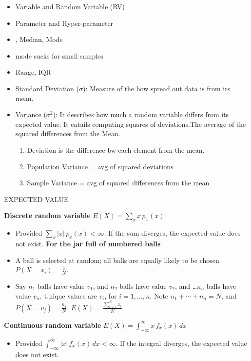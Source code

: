 \documentclass{beamer}
\begin{document}
\begin{frame}%
	\begin{itemize}
		\item Variable and Random Variable (RV)
		\item Parameter and Hyper-parameter
		\item \hyperlink{meanlabel}{}, Median, Mode
		\item mode sucks for small samples
		\item Range, IQR
		\item Standard Deviation ($\sigma$): Measure of the how spread out data is from its mean.
		\item Variance ($\sigma^2$): It describes how much a random variable differs from its expected value. It entails computing squares of deviations.The average of the squared differences from the Mean.\\
		\begin{enumerate}
			\item Deviation is the difference bw each element from the mean.\\
			\item Population Variance = avg of squared deviations\\
			\item Sample Variance = avg of squared differences from the mean
		\end{enumerate}
	\end{itemize}
\end{frame}

\begin{frame}
\hypertarget{meanlabel}{EXPECTED VALUE}\newline
\textbf{Discrete random variable}	$E(X) = \sum_x x \, p_x(x)$
	\begin{itemize}
		\item Provided $\sum_x |x| \, p_x(x) < \infty$. If the sum diverges, the expected value does not exist. 
		\textbf{For the jar full of numbered balls}
		\item A ball is selected at random; all balls are equally likely to be chosen $P(X = x_i) = \frac{1}{N}$.
		\item Say $n_1$ balls have value $v_1$, and $n_2$ balls have value $v_2$, and \ldots  $n_n$ balls have value $v_n$. Unique values are $v_i$, for $i=1, \ldots, n$. Note $n_1 + \cdots + n_n = N$, and $P(X=v_j) = \frac{n_j}{N}$. 
		$E(X) = \frac{\sum_{i=1}^N x_i}{N}$
	
	\end{itemize}

\textbf{Continuous random variable}  $E(X) = \int_{-\infty}^\infty x \, f_x(x) \, dx$
	
	\begin{itemize}
	  \item Provided $ \int_{-\infty}^\infty |x| \, f_x(x) \, dx < \infty$. If the integral diverges, the expected value does not exist. 
	
	\end{itemize}

\end{frame}
\end{document}
